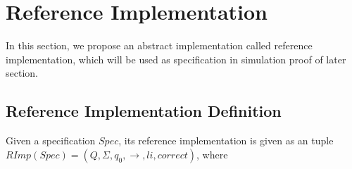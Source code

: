 
\section{Reference Implementation}
\label{sec:reference implementation}

In this section, we propose an abstract implementation called reference implementation, which will be used as specification in simulation proof of later section.


\subsection{Reference Implementation Definition}
\label{subsec:reference implementation definition}

Given a specification $Spec$, its reference implementation is given as an tuple $RImp(Spec) = (Q,\Sigma,q_0,\rightarrow,li,correct)$, where

